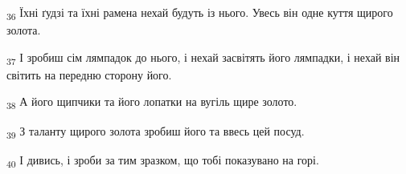 \begin{tcolorbox}
\textsubscript{36} Їхні ґудзі та їхні рамена нехай будуть із нього. Увесь він одне куття щирого золота.
\end{tcolorbox}
\begin{tcolorbox}
\textsubscript{37} І зробиш сім лямпадок до нього, і нехай засвітять його лямпадки, і нехай він світить на передню сторону його.
\end{tcolorbox}
\begin{tcolorbox}
\textsubscript{38} А його щипчики та його лопатки на вугіль щире золото.
\end{tcolorbox}
\begin{tcolorbox}
\textsubscript{39} З таланту щирого золота зробиш його та ввесь цей посуд.
\end{tcolorbox}
\begin{tcolorbox}
\textsubscript{40} І дивись, і зроби за тим зразком, що тобі показувано на горі.
\end{tcolorbox}

